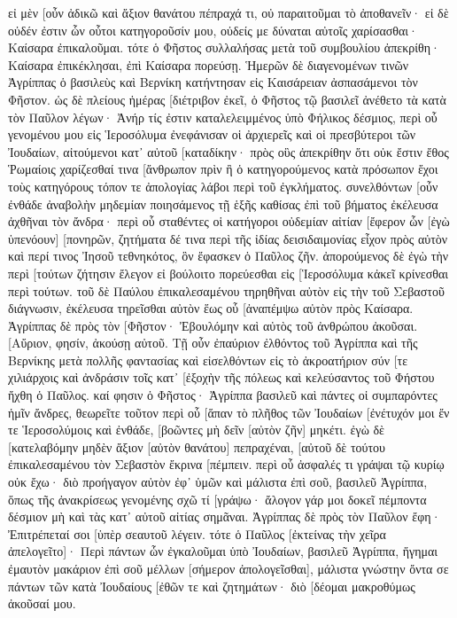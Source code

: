 εἰ μὲν [οὖν ἀδικῶ καὶ ἄξιον θανάτου πέπραχά τι, οὐ παραιτοῦμαι τὸ ἀποθανεῖν· εἰ δὲ οὐδέν ἐστιν ὧν οὗτοι κατηγοροῦσίν μου, οὐδείς με δύναται αὐτοῖς χαρίσασθαι· Καίσαρα ἐπικαλοῦμαι. 
τότε ὁ Φῆστος συλλαλήσας μετὰ τοῦ συμβουλίου ἀπεκρίθη· Καίσαρα ἐπικέκλησαι, ἐπὶ Καίσαρα πορεύσῃ. 
Ἡμερῶν δὲ διαγενομένων τινῶν Ἀγρίππας ὁ βασιλεὺς καὶ Βερνίκη κατήντησαν εἰς Καισάρειαν ἀσπασάμενοι τὸν Φῆστον. 
ὡς δὲ πλείους ἡμέρας [διέτριβον ἐκεῖ, ὁ Φῆστος τῷ βασιλεῖ ἀνέθετο τὰ κατὰ τὸν Παῦλον λέγων· Ἀνήρ τίς ἐστιν καταλελειμμένος ὑπὸ Φήλικος δέσμιος, 
περὶ οὗ γενομένου μου εἰς Ἱεροσόλυμα ἐνεφάνισαν οἱ ἀρχιερεῖς καὶ οἱ πρεσβύτεροι τῶν Ἰουδαίων, αἰτούμενοι κατ᾽ αὐτοῦ [καταδίκην· 
πρὸς οὓς ἀπεκρίθην ὅτι οὐκ ἔστιν ἔθος Ῥωμαίοις χαρίζεσθαί τινα [ἄνθρωπον πρὶν ἢ ὁ κατηγορούμενος κατὰ πρόσωπον ἔχοι τοὺς κατηγόρους τόπον τε ἀπολογίας λάβοι περὶ τοῦ ἐγκλήματος. 
συνελθόντων [οὖν ἐνθάδε ἀναβολὴν μηδεμίαν ποιησάμενος τῇ ἑξῆς καθίσας ἐπὶ τοῦ βήματος ἐκέλευσα ἀχθῆναι τὸν ἄνδρα· 
περὶ οὗ σταθέντες οἱ κατήγοροι οὐδεμίαν αἰτίαν [ἔφερον ὧν [ἐγὼ ὑπενόουν] [πονηρῶν, 
ζητήματα δέ τινα περὶ τῆς ἰδίας δεισιδαιμονίας εἶχον πρὸς αὐτὸν καὶ περί τινος Ἰησοῦ τεθνηκότος, ὃν ἔφασκεν ὁ Παῦλος ζῆν. 
ἀπορούμενος δὲ ἐγὼ τὴν περὶ [τούτων ζήτησιν ἔλεγον εἰ βούλοιτο πορεύεσθαι εἰς [Ἱεροσόλυμα κἀκεῖ κρίνεσθαι περὶ τούτων. 
τοῦ δὲ Παύλου ἐπικαλεσαμένου τηρηθῆναι αὐτὸν εἰς τὴν τοῦ Σεβαστοῦ διάγνωσιν, ἐκέλευσα τηρεῖσθαι αὐτὸν ἕως οὗ [ἀναπέμψω αὐτὸν πρὸς Καίσαρα. 
Ἀγρίππας δὲ πρὸς τὸν [Φῆστον· Ἐβουλόμην καὶ αὐτὸς τοῦ ἀνθρώπου ἀκοῦσαι. [Αὔριον, φησίν, ἀκούσῃ αὐτοῦ. 
Τῇ οὖν ἐπαύριον ἐλθόντος τοῦ Ἀγρίππα καὶ τῆς Βερνίκης μετὰ πολλῆς φαντασίας καὶ εἰσελθόντων εἰς τὸ ἀκροατήριον σύν [τε χιλιάρχοις καὶ ἀνδράσιν τοῖς κατ᾽ [ἐξοχὴν τῆς πόλεως καὶ κελεύσαντος τοῦ Φήστου ἤχθη ὁ Παῦλος. 
καί φησιν ὁ Φῆστος· Ἀγρίππα βασιλεῦ καὶ πάντες οἱ συμπαρόντες ἡμῖν ἄνδρες, θεωρεῖτε τοῦτον περὶ οὗ [ἅπαν τὸ πλῆθος τῶν Ἰουδαίων [ἐνέτυχόν μοι ἔν τε Ἱεροσολύμοις καὶ ἐνθάδε, [βοῶντες μὴ δεῖν [αὐτὸν ζῆν] μηκέτι. 
ἐγὼ δὲ [κατελαβόμην μηδὲν ἄξιον [αὐτὸν θανάτου] πεπραχέναι, [αὐτοῦ δὲ τούτου ἐπικαλεσαμένου τὸν Σεβαστὸν ἔκρινα [πέμπειν. 
περὶ οὗ ἀσφαλές τι γράψαι τῷ κυρίῳ οὐκ ἔχω· διὸ προήγαγον αὐτὸν ἐφ᾽ ὑμῶν καὶ μάλιστα ἐπὶ σοῦ, βασιλεῦ Ἀγρίππα, ὅπως τῆς ἀνακρίσεως γενομένης σχῶ τί [γράψω· 
ἄλογον γάρ μοι δοκεῖ πέμποντα δέσμιον μὴ καὶ τὰς κατ᾽ αὐτοῦ αἰτίας σημᾶναι. 
Ἀγρίππας δὲ πρὸς τὸν Παῦλον ἔφη· Ἐπιτρέπεταί σοι [ὑπὲρ σεαυτοῦ λέγειν. τότε ὁ Παῦλος [ἐκτείνας τὴν χεῖρα ἀπελογεῖτο]· 
Περὶ πάντων ὧν ἐγκαλοῦμαι ὑπὸ Ἰουδαίων, βασιλεῦ Ἀγρίππα, ἥγημαι ἐμαυτὸν μακάριον ἐπὶ σοῦ μέλλων [σήμερον ἀπολογεῖσθαι], 
μάλιστα γνώστην ὄντα σε πάντων τῶν κατὰ Ἰουδαίους [ἐθῶν τε καὶ ζητημάτων· διὸ [δέομαι μακροθύμως ἀκοῦσαί μου. 
